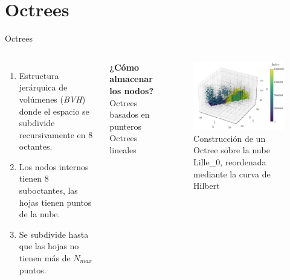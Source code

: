 \documentclass[aspectratio=169]{beamer}
\begin{document}
\section{Octrees}
\begin{frame}{Octrees}
    \begin{columns}
        \begin{enumerate}
            \item Estructura jerárquica de volúmenes (\textit{BVH}) donde el espacio se subdivide recursivamente en $8$ octantes.
            \item Los nodos internos tienen 8 suboctantes, las hojas tienen puntos de la nube. 
            \item Se subdivide hasta que las hojas no tienen más de $N_{max}$ puntos.
        \end{enumerate}
        \vspace{0.8em}

        \begin{block}{\textbf{¿Cómo almacenar los nodos?}}
            \textrightarrow \: Octrees basados en punteros \\
            \textrightarrow \: Octrees lineales
        \end{block}
        \begin{figure}[t]
            \includegraphics[scale=0.55]{img/plot_Lille_0_hilbert_oct.pdf}
            \caption{Construcción de un Octree sobre la nube Lille\_0, reordenada mediante la curva de Hilbert}
        \end{figure}
    \end{columns}
    
\end{frame}
\end{document}
